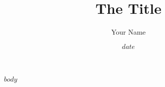 \documentclass[10pt]{article}
\title{The Title}
\author{Your Name}
\date{$date$}
\begin{document}
\maketitle
\newpage
\tableofcontents
$body$
\end{document}
